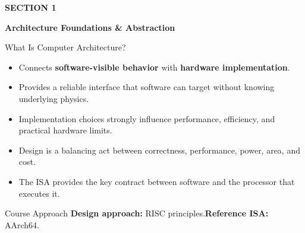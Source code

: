 \documentclass[aspectratio=169,11pt,t]{beamer}
\newcommand{\key}[1]{\textbf{#1}}
\begin{document}
\begin{frame}[plain]


\vspace*{\fill}

\begin{minipage}{0.94\textwidth}
\raggedright
{}

{\color{gold}\large\bfseries SECTION 1\par}

\vspace{0.3cm}

{\color{white}\fontsize{22}{26}\selectfont\bfseries
Architecture Foundations \& Abstraction\par}

\end{minipage}
\vspace*{\fill}
\end{frame}






\begin{frame}{What Is Computer Architecture?}

\begin{itemize}\setlength{\itemsep}{4pt}
  \item Connects \key{software-visible behavior} with \key{hardware implementation}.
  \item Provides a reliable interface that software can target without knowing underlying physics.
  \item Implementation choices strongly influence performance, efficiency, and practical hardware limits.
  \item Design is a balancing act between correctness, performance, power, area, and cost.
  \item The ISA provides the key contract between software and the processor that executes it.
\end{itemize}

\vspace{0.4cm}

\begin{block}{Course Approach}
\key{Design approach:} RISC principles.\quad\quad \key{Reference ISA:} AArch64.
\end{block}

\end{frame}
\end{document}
